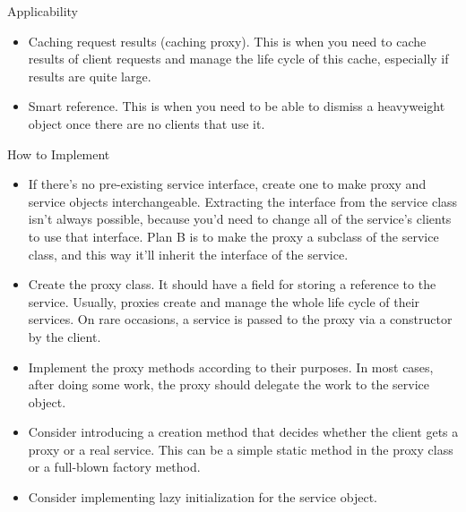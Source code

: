 \documentclass[13pt]{beamer}
\begin{document}
\begin{frame}{Applicability}
	\begin{itemize}
		\setlength\itemsep{1em}
		\item Caching request results (caching proxy). This is when you need to cache results of client requests and manage the life cycle of this cache, especially if results are quite large.
		\item Smart reference. This is when you need to be able to dismiss a heavyweight object once there are no clients that use it.
	\end{itemize}
\end{frame}

\begin{frame}{How to Implement}
	\begin{itemize}
		\setlength\itemsep{1em}
		\item If there’s no pre-existing service interface, create one to make proxy and service objects interchangeable. Extracting the interface from the service class isn’t always possible, because you’d need to change all of the service’s clients to use that interface. Plan B is to make the proxy a subclass of the service class, and this way it’ll inherit the interface of the service.
		\item Create the proxy class. It should have a field for storing a reference to the service. Usually, proxies create and manage the whole life cycle of their services. On rare occasions, a service is passed to the proxy via a constructor by the client.
		\item Implement the proxy methods according to their purposes. In most cases, after doing some work, the proxy should delegate the work to the service object.
		\item Consider introducing a creation method that decides whether the client gets a proxy or a real service. This can be a simple static method in the proxy class or a full-blown factory method.
		\item Consider implementing lazy initialization for the service object.
	\end{itemize}
\end{frame}
\end{document}
